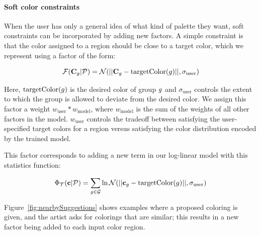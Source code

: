 \paragraph{Soft color constraints} When the user has only a general idea of what kind of palette they want, soft constraints can be incorporated by adding new factors. A simple constraint is that the color assigned to a region should be close to a target color, which we represent using a factor of the form:

\begin{equation*}
\mathcal{F}(\mathbf{C}_g | \mathcal{P}) = \mathcal{N}(||\mathbf{C}_g - \textrm{targetColor}(g)||, \sigma_\textrm{user})
\end{equation*}

Here, $\textrm{targetColor}(g)$ is the desired color of group $g$ and $\sigma_\textrm{user}$ controls the extent to which the group is allowed to deviate from the desired color. We assign this factor a weight $w_\textrm{user} * w_\textrm{model}$, where $w_\textrm{model}$ is the sum of the weights of all other factors in the model. $w_\textrm{user}$ controls the tradeoff between satisfying the user-specified target colors for a region versus satisfying the color distribution encoded by the trained model.

This factor corresponds to adding a new term in our log-linear model with this statistics function:

\begin{equation*}
\Phi_{\mathcal{T}}(\mathbf{c} | \mathcal{P}) = \sum_{g \in \mathcal{G}}{\ln \mathcal{N}(||\mathbf{c}_g - \textrm{targetColor}(g)||, \sigma_\textrm{user})}
\end{equation*}

Figure~\ref{fig:nearbySuggestions} shows examples where a proposed coloring is given, and the artist asks for colorings that are similar; this results in a new factor being added to each input color region. %

